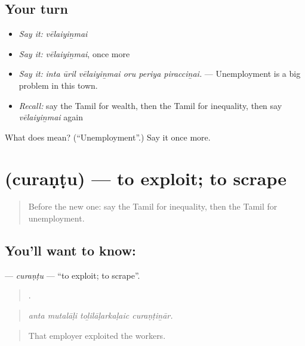 \subsection*{Your turn}
\begin{itemize}
\raggedright
  \item \emph{Say it:} \emph{vēlaiyiṉmai}
  \item \emph{Say it:} \emph{vēlaiyiṉmai}, once more
  \item \emph{Say it:} \emph{inta ūril vēlaiyiṉmai oru periya piracciṉai.} — Unemployment is a big problem in this town.
  \item \emph{Recall:} say the Tamil for wealth, then the Tamil for inequality, then say \emph{vēlaiyiṉmai} again
\end{itemize}

\begin{tcolorbox}[breakable,colback=teal!4,colframe=teal!35!black,title={Before you move on}]
What does  mean? (\textquotedblleft{}Unemployment\textquotedblright{}.) Say it once more.
\end{tcolorbox}
\section[\texorpdfstring{\ta{சுரண்டு} (curaṇṭu)}{சுரண்டு (curaṇṭu)}]{ (curaṇṭu) — to exploit; to scrape}

\label{lesson:TA-C370-curantu}



\begin{quote}
Before the new one: say the Tamil for inequality, then the Tamil for unemployment.
\end{quote}

\subsection*{You'll want to know: }
\textbf{} — \emph{curaṇṭu} — \textquotedblleft{}to exploit; to scrape\textquotedblright{}.

\begin{quote}
   .
\end{quote}

\begin{quote}
\emph{anta mutalāḷi toḻilāḷarkaḷaic curaṇṭiṉār.}
\end{quote}

\begin{quote}
That employer exploited the workers.
\end{quote}

